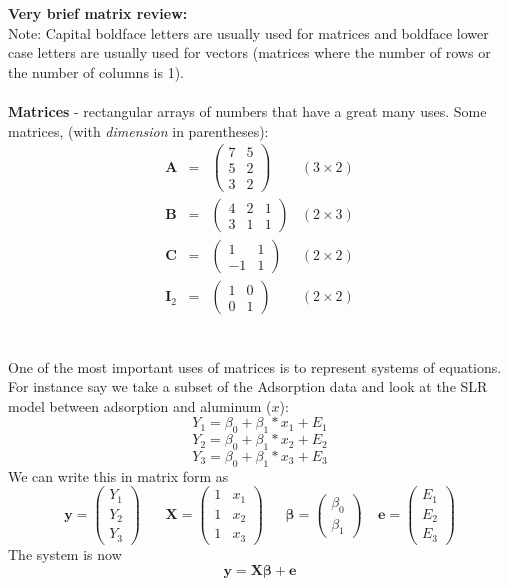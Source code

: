 \Large\textbf{Very brief matrix review:}\large\\
Note: Capital boldface letters are usually used for matrices and boldface lower case letters are usually used for vectors (matrices where the number of rows or the number of columns is 1).\\~\\
\textbf{Matrices} - rectangular arrays of numbers that have a great many uses.  Some matrices, (with {\em dimension} in parentheses):
\[
\begin{array}{cccc}
\textbf{A}&=&\left(\begin{array}{cc} 7 & 5 \\ 5 & 2 \\ 3 & 2 \end{array}\right)  & (3 \times 2) \\
\textbf{B}&=&\left(\begin{array}{ccc} 4 & 2 & 1 \\ 3 & 1 & 1 \end{array}\right)  & (2 \times 3)  \\
\textbf{C}&=&\left(\begin{array}{cc} 1 & 1 \\ -1 & 1 \end{array}\right) & (2 \times 2) \\
\textbf{I}_2&=&\left(\begin{array}{cc} 1 & 0 \\ 0 & 1 \end{array}\right) & (2 \times 2)
\end{array}
\]
~\\~\\
One of the most important uses of matrices is to represent systems of equations.  For instance say we take a subset of the Adsorption data and look at the SLR model between adsorption and aluminum ($x$):
$$Y_1=\beta_0+\beta_1*x_1+E_1$$
$$Y_2=\beta_0+\beta_1*x_2+E_2$$
$$Y_3=\beta_0+\beta_1*x_3+E_3$$
We can write this in matrix form as
$$\textbf{y}=\left(\begin{array}{c}Y_1 \\ Y_2\\ Y_3\end{array}\right)~~~~~~~~\textbf{X}=\left(\begin{array}{cc} 1 & x_1\\ 1 & x_2 \\ 1 & x_3\end{array}\right)~~~~~~~\boldsymbol{\beta}=\left(\begin{array}{c}\beta_0\\\beta_1\end{array}\right)~~~~~\textbf{e}=\left(\begin{array}{c} E_1\\E_2\\E_3\end{array}\right)$$
The system is now
$$\textbf{y}=\textbf{X}\boldsymbol{\beta}+\textbf{e}$$

